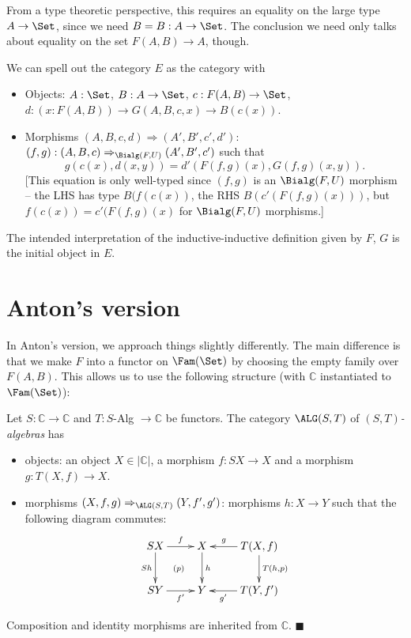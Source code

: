 \documentclass{article}
\begin{document}
\begin{remark}
  From a type theoretic perspective, this requires an equality on the
  large type $A \to \Set$, since we need $B = B : A \to \Set$. The
  conclusion we need only talks about equality on the set $F(A, B) \to
  A$, though.
\end{remark}

We can spell out the category $E$ as the category with
\begin{itemize}
\item Objects: $A : \Set$, $B : A \to \Set$, $c : F(A, B) \to \Set$, $d : (x : F(A, B)) \to G(A, B, c, x) \to B(c(x))$.
\item Morphisms $(A, B, c, d) \Rightarrow (A', B', c', d')$: $(f, g) :
  (A, B, c) \Rightarrow_{\Bialg(F, U)} (A', B', c')$ such that
  \[
  g(c(x), d(x, y)) = d'(F(f,g)(x), G(f,g)(x, y)).
  \]
[This equation is only well-typed since $(f,g)$ is an $\Bialg(F, U)$ morphism -- the LHS has type $B(f(c(x))$, the RHS $B(c'(F(f,g)(x)))$, but $f(c(x)) = c'(F(f,g)(x)$ for $\Bialg(F,U)$ morphisms.]
\end{itemize}

The intended interpretation of the inductive-inductive definition given by $F$, $G$ is the initial object in $E$.

\section{Anton's version} \label{anton}

In Anton's version, we approach things slightly differently. The main
difference is that we make $F$ into a functor on $\Fam(\Set)$ by
choosing the empty family over $F(A, B)$. This allows us to use the following structure (with $\mathbb{C}$ instantiated to $\Fam(\Set)$):

\begin{definition}
  Let $S : \mathbb{C} \to \mathbb{C}$ and $T : S$-Alg $\to \mathbb{C}$
  be functors. The category $\ALG(S, T)$ of \emph{$(S, T)$-algebras} has
  \begin{itemize}
  \item objects: an object $X \in |\mathbb{C}|$, a morphism $f : SX \to X$ and a morphism $g : T(X, f) \to X$.
  \item morphisms $(X, f, g) \Rightarrow_{\ALG(S, T)} (Y, f', g')$: morphisms $h : X \to Y$ such that the following diagram commutes:
\[
\xymatrix{
SX \ar^-{f}[r] \ar_-{Sh}[d] & X \ar^-{h}[d] & T(X, f) \ar_-{g}[l] \ar^-{T(h, p)}[d] \\
SY \ar_-{f'}[r] \ar@{}|{(p)}[ur] & Y  & T(Y, f') \ar^-{g'}[l]  \\
}
\]
  \end{itemize}
  Composition and identity morphisms are inherited from $\mathbb{C}$.
\hfill $\blacksquare$
\end{definition}
\end{document}
